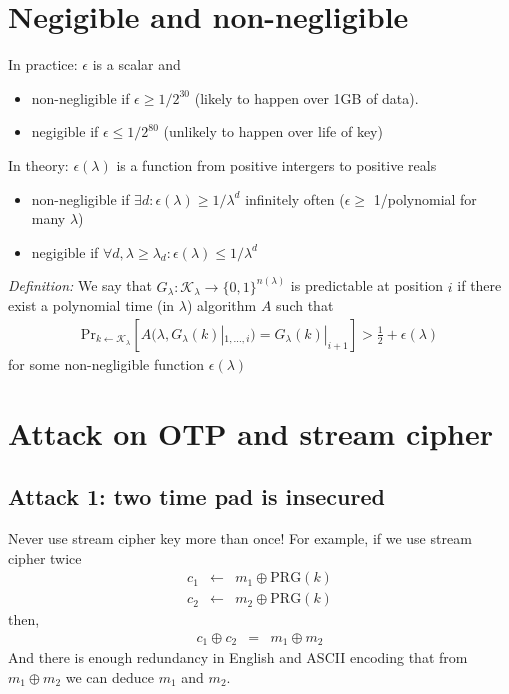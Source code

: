 \documentclass{article}
\begin{document}
\section{Negigible and non-negligible}

In practice: $\epsilon$ is a scalar and 
\begin{itemize}
\item non-negligible if $\epsilon \ge 1 / 2^{30}$ (likely to happen over 1GB of
data).
\item negigible if $\epsilon \le 1 / 2^{80}$ (unlikely to happen over life of 
key)
\end{itemize}

In theory: $\epsilon(\lambda)$ is a function from positive intergers to 
positive reals
\begin{itemize}
\item non-negligible if $\exists d: \epsilon(\lambda) \ge 1 / \lambda^d$ 
infinitely often ($\epsilon \ge $ 1/polynomial for many $\lambda$)
\item negigible if $\forall d, \lambda \ge \lambda_d: \epsilon(\lambda) \le
1/\lambda^d$
\end{itemize}

\emph{Definition:} We say that $G_\lambda: \mathcal{K}_\lambda \to \lbrace 0,1 
\rbrace^{n(\lambda)}$ is predictable at position $i$  if there exist a polynomial
time (in $\lambda$) algorithm $A$ such that 
\begin{eqnarray}
\text{Pr}_{k \leftarrow \mathcal{K}_\lambda} \left[ A(\lambda, G_\lambda(k)|_{1, \ldots,
i}) =  G_\lambda(k)|_{i+1} \right] > \frac{1}{2} + \epsilon(\lambda)
\end{eqnarray}
for some non-negligible function $\epsilon(\lambda)$
\section{Attack on OTP and stream cipher}

\subsection{Attack 1: two time pad is insecured}
Never use stream cipher key more than once! For example, if we use stream cipher
twice
\begin{eqnarray}
  c_1 &\leftarrow& m_1 \oplus \text{PRG}(k)\\
  c_2 &\leftarrow& m_2 \oplus \text{PRG}(k)
\end{eqnarray}
then,
\begin{eqnarray}
  c_1 \oplus c_2 &=& m_1 \oplus m_2
\end{eqnarray}
And there is enough redundancy in English and ASCII encoding that from $m_1
\oplus m_2$ we can deduce $m_1$ and $m_2$.
\end{document}
